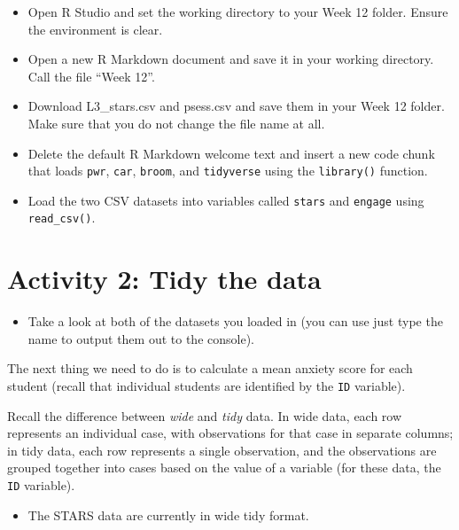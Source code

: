 \documentclass[]{book}
\providecommand{\tightlist}{%
  \setlength{\itemsep}{0pt}\setlength{\parskip}{0pt}}
\begin{document}
\begin{itemize}
\tightlist
\item
  Open R Studio and set the working directory to your Week 12 folder. Ensure the environment is clear.\\
\item
  Open a new R Markdown document and save it in your working directory. Call the file ``Week 12''.\\
\item
  Download L3\_stars.csv and psess.csv and save them in your Week 12 folder. Make sure that you do not change the file name at all.\\
\item
  Delete the default R Markdown welcome text and insert a new code chunk that loads \texttt{pwr}, \texttt{car}, \texttt{broom}, and \texttt{tidyverse} using the \texttt{library()} function.
\item
  Load the two CSV datasets into variables called \texttt{stars} and \texttt{engage} using \texttt{read\_csv()}.
\end{itemize}

\hypertarget{activity-2-tidy-the-data}{%
\section{Activity 2: Tidy the data}\label{activity-2-tidy-the-data}}

\begin{itemize}
\tightlist
\item
  Take a look at both of the datasets you loaded in (you can use just type the name to output them out to the console).
\end{itemize}

The next thing we need to do is to calculate a mean anxiety score for each student (recall that individual students are identified by the \texttt{ID} variable).

Recall the difference between \emph{wide} and \emph{tidy} data. In wide data, each row represents an individual case, with observations for that case in separate columns; in tidy data, each row represents a single observation, and the observations are grouped together into cases based on the value of a variable (for these data, the \texttt{ID} variable).

\begin{itemize}
\tightlist
\item
  The STARS data are currently in wide tidy format.
\end{itemize}
\end{document}
